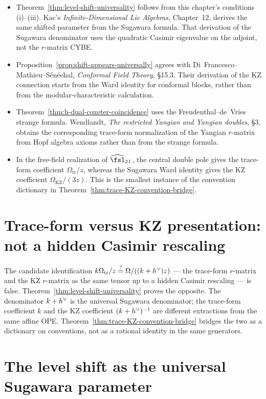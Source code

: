 \begin{itemize}
 \item Theorem~\ref{thm:level-shift-universality} follows from this
 chapter's conditions (i)--(iii).  Kac's
 \emph{Infinite-Dimensional Lie Algebras}, Chapter~12, derives the
 same shifted parameter from the Sugawara formula.  That derivation
 of the Sugawara denominator uses the quadratic Casimir eigenvalue
 on the adjoint, not the $r$-matrix CYBE.
 \item Proposition~\ref{prop:shift-appears-universally} agrees with
 Di~Francesco--Mathieu--S\'en\'echal, \emph{Conformal Field Theory},
 \S15.3.  Their derivation of
 the KZ connection starts from the Ward identity for conformal blocks,
 rather than from the modular-characteristic calculation.
 \item Theorem~\ref{thm:h-dual-coxeter-coincidence} uses the
 Freudenthal--de~Vries strange formula.  Wendlandt,
 \emph{The restricted Yangian and Yangian doubles}, \S3, obtains the
 corresponding trace-form normalization of the Yangian $r$-matrix
 from Hopf algebra axioms rather than from the strange formula.
 \item In the free-field realization of
 $\widehat{\fsl}_2{}_1$, the central double pole gives the
 trace-form coefficient $\Omega_{\mathrm{tr}}/z$, whereas the
 Sugawara Ward identity gives the KZ coefficient
 $\Omega_{\mathrm{KZ}}/(3z)$.  This is the smallest instance of the
 convention dictionary in
 Theorem~\ref{thm:trace-KZ-convention-bridge}.
\end{itemize}

\section{Trace-form versus KZ presentation: not a hidden Casimir rescaling}
\label{sec:trace-vs-kz-r-matrix-disambiguation}

The candidate identification
$k\Omega_{\mathrm{tr}}/z \stackrel{?}{=} \Omega/((k+h^{\vee})z)$ — the trace-form
$r$-matrix and the KZ $r$-matrix as the same tensor up to a
hidden Casimir rescaling — is false.
Theorem~\ref{thm:level-shift-universality} proves the opposite. The
denominator $k+h^{\vee}$ is the universal Sugawara denominator; the
trace-form coefficient $k$ and the KZ coefficient $(k+h^{\vee})^{-1}$
are different extractions from the same affine OPE.
Theorem~\ref{thm:trace-KZ-convention-bridge} bridges the two as a
dictionary on conventions, not as a rational identity in the same
generators.

\section*{The level shift as the universal Sugawara parameter}

